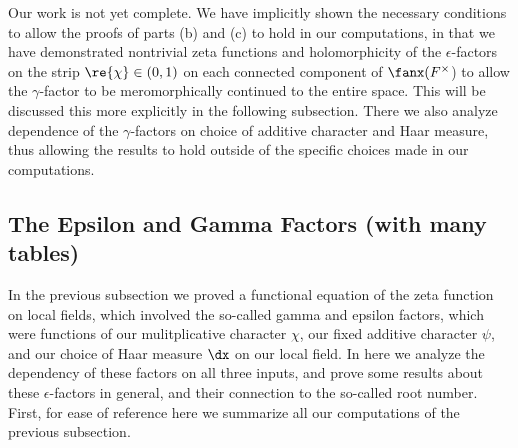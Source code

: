 \documentclass[11pt, x11names, openany]{book}
\begin{document}
Our work is not yet complete. We have implicitly shown the necessary conditions to allow the proofs of parts (b) and (c) to hold in our computations, in that we have demonstrated nontrivial zeta functions and holomorphicity of the $\epsilon$-factors on the strip $\re{\chi} \in (0, 1)$ on each connected component of $\fanx(F^\times$) to allow the $\gamma$-factor to be meromorphically continued to the entire space. This will be discussed this more explicitly in the following subsection. There we also analyze dependence of the $\gamma$-factors on choice of additive character and Haar measure, thus allowing the results to hold outside of the specific choices made in our computations.

\subsection{The Epsilon and Gamma Factors (with many tables)}
\label{subsection: The Epsilon and Gamma factors}

In the previous subsection we proved a functional equation of the zeta function on local fields, which involved the so-called gamma and epsilon factors, which were functions of our mulitplicative character $\chi$, our fixed additive character $\psi$, and our choice of Haar measure $\dx$ on our local field. In here we analyze the dependency of these factors on all three inputs, and prove some results about these $\epsilon$-factors in general, and their connection to the so-called root number. First, for ease of reference here we summarize all our computations of the previous subsection.\\


\renewcommand{\arraystretch}{1.5}
\end{document}
